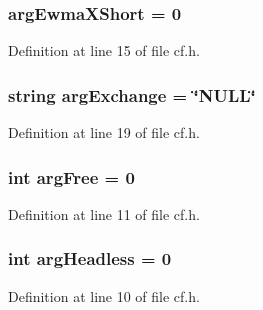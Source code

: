 \subsubsection[{\texorpdfstring{arg\+Ewma\+X\+Short}{argEwmaXShort}}]{ arg\+Ewma\+X\+Short = 0}\hypertarget{class_k_1_1_c_f_a456df187a38686bcf173a862674b25ed}{}\label{class_k_1_1_c_f_a456df187a38686bcf173a862674b25ed}


Definition at line 15 of file cf.\+h.

\subsubsection[{\texorpdfstring{arg\+Exchange}{argExchange}}]{\setlength{\rightskip}{0pt plus 5cm}string arg\+Exchange = \char`\"{}N\+U\+LL\char`\"{}}\hypertarget{class_k_1_1_c_f_ac2c90c943260d1f24bb92efa33e2f7ff}{}\label{class_k_1_1_c_f_ac2c90c943260d1f24bb92efa33e2f7ff}


Definition at line 19 of file cf.\+h.

\subsubsection[{\texorpdfstring{arg\+Free}{argFree}}]{\setlength{\rightskip}{0pt plus 5cm}int arg\+Free = 0}\hypertarget{class_k_1_1_c_f_a41db2c0e2e4ceca1dfff39f0ba30d72e}{}\label{class_k_1_1_c_f_a41db2c0e2e4ceca1dfff39f0ba30d72e}


Definition at line 11 of file cf.\+h.

\subsubsection[{\texorpdfstring{arg\+Headless}{argHeadless}}]{\setlength{\rightskip}{0pt plus 5cm}int arg\+Headless = 0}\hypertarget{class_k_1_1_c_f_a4f93aa825293f552b554aa0f75eba23f}{}\label{class_k_1_1_c_f_a4f93aa825293f552b554aa0f75eba23f}


Definition at line 10 of file cf.\+h.

